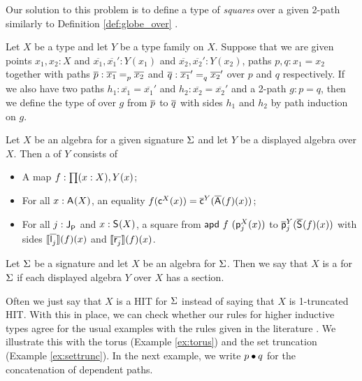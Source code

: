 Our solution to this problem is to define a type of \emph{squares} over a given 2-path similarly to Definition \ref{def:globe_over} \cite{licata2015cubical}.

\begin{definition}
Let $X$ be a type and let $Y$ be a type family on $X$.
Suppose that we are given points $x_1, x_2 : X$ and $\overline{x_1}, \overline{x_1}' : Y(x_1)$ and $\overline{x_2}, \overline{x_2}' : Y(x_2)$, paths $p, q : x_1 = x_2$ together with paths $\pover{p} : \pathover{p}{\overline{x_1}}{\overline{x_2}}$ and $\pover{q} : \pathover{q}{\overline{x_1}'}{\overline{x_2}'}$ over $p$ and $q$ respectively.
If we also have two paths $h_1 : \overline{x_1} = \overline{x_1}'$ and $h_2 : \overline{x_2} = \overline{x_2}'$ and a 2-path $g : p = q$,
then we define the type of  over $g$ from $\pover{p}$ to $\pover{q}$ with sides $h_1$ and $h_2$ by path induction on $g$.
\end{definition}

\begin{definition}
\label{def:section}
Let $X$ be an algebra for a given signature $\sign$ and let $Y$ be a displayed algebra over $X$.
Then a  of $Y$ consists of
\begin{itemize}
	\item A map $f : \depprod{(x : X)}{Y(x)}$;
	\item For all $x : \polyAct{\pointconstr}{X}$, an equality $f(\AlgPoint{X}(x)) = \DispAlgPoint{Y}(\polyDmap{\pointconstr}{f}(x))$;
	\item For all $j : \pathlabel$ and $x : \polyAct{\patharg}{X}$, a square from
	$\apd{f}{(\AlgPath{X}{j}(x))}$
	to
	$\DispAlgPath{Y}{j}(\polyDmap{\patharg}{f}(x))$
	with sides
	$\pathendpointDnat{\pathleft_j}{f}(x)$
	and
	$\pathendpointDnat{\pathright_j}{f}(x)$.
\end{itemize}
\end{definition}

\begin{definition}
Let $\sign$ be a signature and let $X$ be an algebra for $\sign$.
Then we say that $X$ is a  for $\sign$ if each displayed algebra $Y$ over $X$ has a section.
\end{definition}

Often we just say that $X$ is a HIT for $\sign$ instead of saying that $X$ is 1-truncated HIT.
With this in place, we can check whether our rules for higher inductive types
agree for the usual examples with the rules given in the literature \cite{hottbook}.
We illustrate this with the torus (Example \ref{ex:torus}) and the set truncation (Example \ref{ex:settrunc}).
In the next example, we write $p \vcomp q$ for the concatenation of dependent paths.

